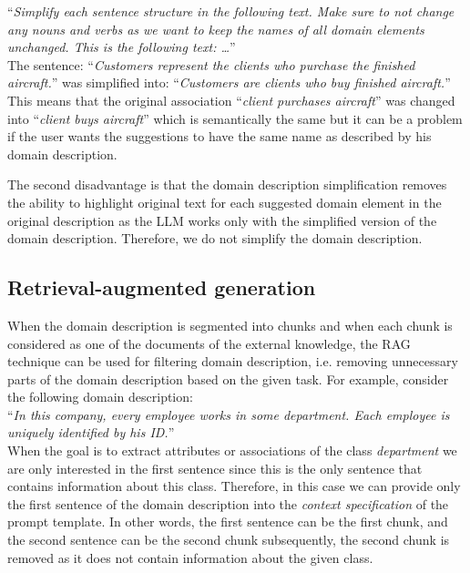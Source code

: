 \noindent{}``\textit{Simplify each sentence structure in the following text. Make sure to not change any nouns and verbs as we want to keep the names of all domain elements unchanged. This is the following text: \ldots}'' \\

\noindent{}The sentence: ``\textit{Customers represent the clients who purchase the finished aircraft.}'' was simplified into: ``\textit{Customers are clients who buy finished aircraft.}'' This means that the original association ``\textit{client purchases aircraft}'' was changed into ``\textit{client buys aircraft}'' which is semantically the same but it can be a problem if the user wants the suggestions to have the same name as described by his domain description.

The second disadvantage is that the domain description simplification removes the ability to highlight original text for each suggested domain element in the original description as the LLM works only with the simplified version of the domain description. Therefore, we do not simplify the domain description.


\subsection{Retrieval-augmented generation}

When the domain description is segmented into chunks and when each chunk is considered as one of the documents of the external knowledge, the RAG technique can be used for filtering domain description, i.e. removing unnecessary parts of the domain description based on the given task. For example, consider the following domain description: \\

\noindent{}``\textit{In this company, every employee works in some department. Each employee is uniquely identified by his ID.}''\\

\noindent{}When the goal is to extract attributes or associations of the class \textit{department} we are only interested in the first sentence since this is the only sentence that contains information about this class. Therefore, in this case we can provide only the first sentence of the domain description into the \emph{context specification} of the prompt template. In other words, the first sentence can be the first chunk, and the second sentence can be the second chunk subsequently, the second chunk is removed as it does not contain information about the given class.


